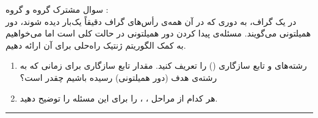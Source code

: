 \documentclass[a4paper,10pt]{article}
\newcommand{\GroupA}{\noindent \textcolor{AccentGold}{گروه \lr{a}}}
\newcommand{\GroupB}{\noindent\textcolor{AccentCyan}{گروه \lr{b}}}
\begin{document}
	سوال مشترک \GroupA و \GroupB: 
\vspace{0.2cm}
\\
\noindent
	در یک گراف، به دوری که در آن همه‌ی رأس‌های گراف دقیقاً یک‌بار دیده شوند، دور همیلتونی می‌گویند. مسئله‌ی پیدا کردن دور همیلتونی در حالت کلی  است اما می‌خواهیم به کمک الگوریتم ژنتیک راه‌حلی برای آن ارائه دهیم.
	
	\begin{enumerate}
		\item[(الف)] رشته‌های  و تابع سازگاری () را تعریف کنید. مقدار تابع سازگاری برای زمانی که به رشته‌ی هدف (دور همیلتونی) رسیده باشیم چقدر است؟
		
		\item[(ب)] هر کدام از مراحل ، ،  را برای این مسئله را توضیح دهید.
	\end{enumerate}


\bigskip
\textcolor{AccentCyan}{\rule{\linewidth}{0.4pt}}

\end{document}
